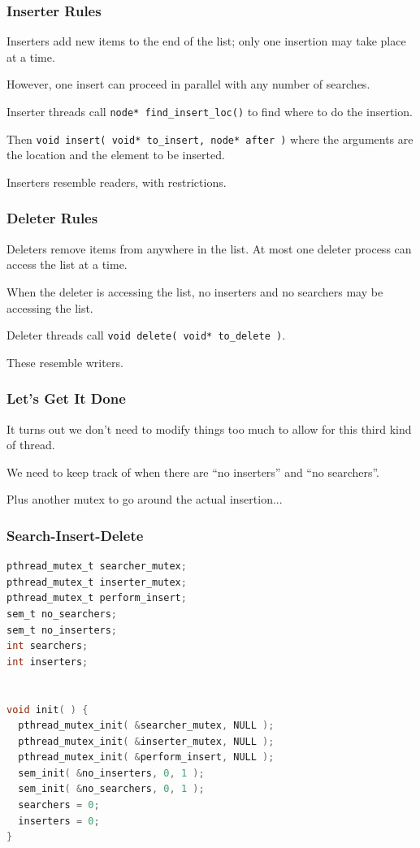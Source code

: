 \begin{frame}
	\frametitle{Inserter Rules}

	\alert{Inserters} add new items to the end of the list; only one insertion may take place at a time.

	However, one insert can proceed in parallel with any number of searches.

	Inserter threads call \texttt{node* find\_insert\_loc()} to find where to do the insertion.

	Then \texttt{void insert( void* to\_insert, node* after )} where the arguments are the location and the element to be inserted.

	Inserters resemble readers, with restrictions.

\end{frame}


\begin{frame}
	\frametitle{Deleter Rules}

	\alert{Deleters} remove items from anywhere in the list. At most one deleter process can access the list at a time.

	When the deleter is accessing the list, no inserters and no searchers may be accessing the list.

	Deleter threads call \texttt{void delete( void* to\_delete )}.

	These resemble writers.

\end{frame}


\begin{frame}
	\frametitle{Let's Get It Done}

	It turns out we don't need to modify things too much to allow for this third kind of thread.

	We need to keep track of when there are ``no inserters'' and ``no searchers''.

	Plus another mutex to go around the actual insertion...

\end{frame}


\begin{frame}[fragile]
	\frametitle{Search-Insert-Delete}
	\begin{lstlisting}[language=C]
pthread_mutex_t searcher_mutex;
pthread_mutex_t inserter_mutex;
pthread_mutex_t perform_insert;
sem_t no_searchers;
sem_t no_inserters;
int searchers;
int inserters;


void init( ) {
  pthread_mutex_init( &searcher_mutex, NULL );
  pthread_mutex_init( &inserter_mutex, NULL );
  pthread_mutex_init( &perform_insert, NULL );
  sem_init( &no_inserters, 0, 1 );
  sem_init( &no_searchers, 0, 1 );
  searchers = 0;
  inserters = 0;
}
\end{lstlisting}
\end{frame}

